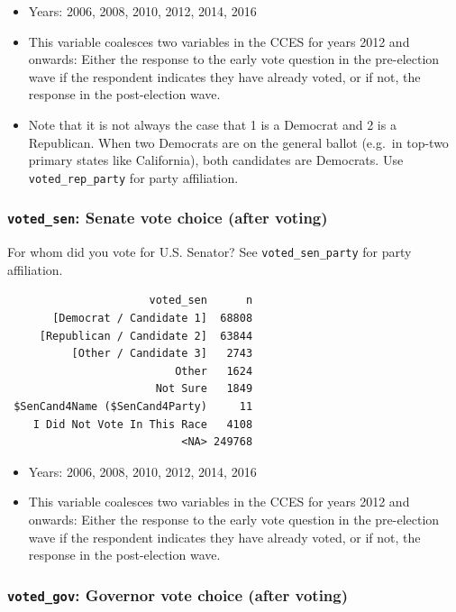 \documentclass[10pt,article,oneside]{memoir}
\theoremstyle{definition}
\begin{document}
\begin{itemize}
\tightlist
\item
  Years: 2006, 2008, 2010, 2012, 2014, 2016
\item
  This variable coalesces two variables in the CCES for years 2012 and
  onwards: Either the response to the early vote question in the
  pre-election wave if the respondent indicates they have already voted,
  or if not, the response in the post-election wave.
\item
  Note that it is not always the case that 1 is a Democrat and 2 is a
  Republican. When two Democrats are on the general ballot (e.g.~in
  top-two primary states like California), both candidates are
  Democrats. Use \texttt{voted\_rep\_party} for party affiliation.
\end{itemize}

\hypertarget{voted_sen-senate-vote-choice-after-voting}{%
\subsubsection{\texorpdfstring{\texttt{voted\_sen}: Senate vote choice
(after
voting)}{voted\_sen: Senate vote choice (after voting)}}\label{voted_sen-senate-vote-choice-after-voting}}

For whom did you vote for U.S. Senator? See \texttt{voted\_sen\_party}
for party affiliation.

\begin{verbatim}
                      voted_sen      n
       [Democrat / Candidate 1]  68808
     [Republican / Candidate 2]  63844
          [Other / Candidate 3]   2743
                          Other   1624
                       Not Sure   1849
 $SenCand4Name ($SenCand4Party)     11
    I Did Not Vote In This Race   4108
                           <NA> 249768
\end{verbatim}

\begin{itemize}
\tightlist
\item
  Years: 2006, 2008, 2010, 2012, 2014, 2016
\item
  This variable coalesces two variables in the CCES for years 2012 and
  onwards: Either the response to the early vote question in the
  pre-election wave if the respondent indicates they have already voted,
  or if not, the response in the post-election wave.
\end{itemize}

\hypertarget{voted_gov-governor-vote-choice-after-voting}{%
\subsubsection{\texorpdfstring{\texttt{voted\_gov}: Governor vote choice
(after
voting)}{voted\_gov: Governor vote choice (after voting)}}\label{voted_gov-governor-vote-choice-after-voting}}
\end{document}

